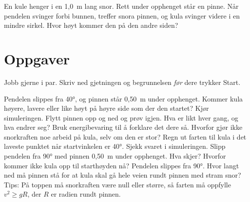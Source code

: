 \documentclass[11pt]{article}
\begin{document}

En kule henger i en 1,0~m lang snor. Rett under opphenget står en pinne. Når pendelen svinger forbi bunnen, treffer snora pinnen, og kula svinger videre i en mindre sirkel. Hvor høyt kommer den på den andre siden?

\section*{Oppgaver}

Jobb gjerne i par. Skriv ned gjetningen og begrunnelsen \emph{før} dere trykker Start.

\begin{oppgaveliste}
\oppgave {}Pendelen slippes fra 40°, og pinnen står 0,50~m under opphenget. Kommer kula høyere, lavere eller like høyt på høyre side som der den startet?
\svar
\oppgave {}Kjør simuleringen. Flytt pinnen opp og ned og prøv igjen. Hva er likt hver gang, og hva endrer seg?
\svar
\oppgave {}Bruk energibevaring til å forklare det dere så. Hvorfor gjør ikke snorkraften noe arbeid på kula, selv om den er stor?
\svar
\oppgave {}Regn ut farten til kula i det laveste punktet når startvinkelen er 40°. Sjekk svaret i simuleringen.
\svar
\oppgave {}Slipp pendelen fra 90° med pinnen 0,50~m under opphenget. Hva skjer? Hvorfor kommer ikke kula opp til starthøyden nå?
\svar
\oppgave {}Pendelen slippes fra 90°. Hvor langt ned må pinnen stå for at kula skal gå hele veien rundt pinnen med stram snor? Tips: På toppen må snorkraften være null eller større, så farten må oppfylle $v^{2} \geq gR$, der $R$ er radien rundt pinnen.
\svar
\end{oppgaveliste}
\end{document}
